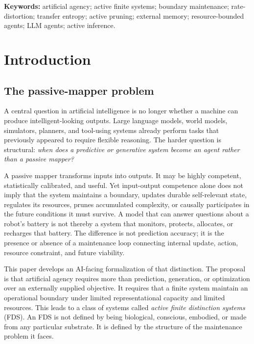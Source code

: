 \documentclass[10pt,a4paper,twocolumn,aps,prl]{revtex4-2}
\begin{document}
\maketitle

\noindent\textbf{Keywords:} artificial agency; active finite systems; boundary maintenance; rate-distortion; transfer entropy; active pruning; external memory; resource-bounded agents; LLM agents; active inference.

\section{Introduction}

\subsection{The passive-mapper problem}

A central question in artificial intelligence is no longer whether a machine can produce intelligent-looking outputs. Large language models, world models, simulators, planners, and tool-using systems already perform tasks that previously appeared to require flexible reasoning. The harder question is structural: \emph{when does a predictive or generative system become an agent rather than a passive mapper?}

A passive mapper transforms inputs into outputs. It may be highly competent, statistically calibrated, and useful. Yet input-output competence alone does not imply that the system maintains a boundary, updates durable self-relevant state, regulates its resources, prunes accumulated complexity, or causally participates in the future conditions it must survive. A model that can answer questions about a robot's battery is not thereby a system that monitors, protects, allocates, or recharges that battery. The difference is not prediction accuracy; it is the presence or absence of a maintenance loop connecting internal update, action, resource constraint, and future viability.

This paper develops an AI-facing formalization of that distinction. The proposal is that artificial agency requires more than prediction, generation, or optimization over an externally supplied objective. It requires that a finite system maintain an operational boundary under limited representational capacity and limited resources. This leads to a class of systems called \emph{active finite distinction systems} (FDS). An FDS is not defined by being biological, conscious, embodied, or made from any particular substrate. It is defined by the structure of the maintenance problem it faces.
\end{document}
